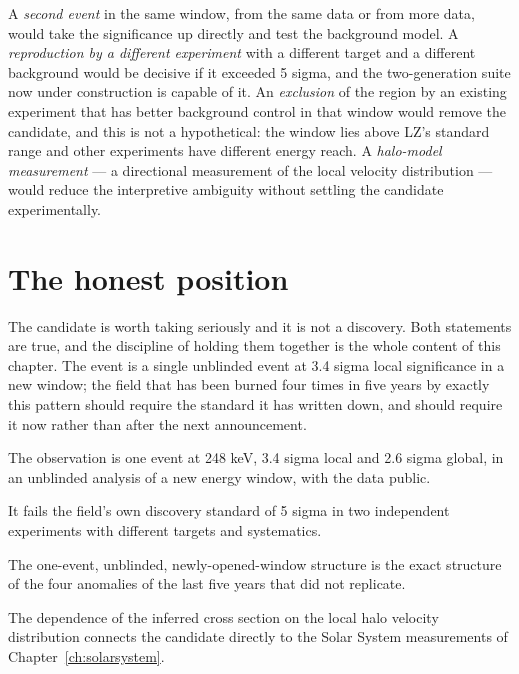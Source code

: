 A \emph{second event} in the same window, from the same data or from more
data, would take the significance up directly and test the background
model. A \emph{reproduction by a different experiment} with a different
target and a different background would be decisive if it exceeded 5 sigma,
and the two-generation suite now under construction is capable of it.
An \emph{exclusion} of the region by an existing experiment that has better
background control in that window would remove the candidate, and this is
not a hypothetical: the window lies above LZ's standard range and other
experiments have different energy reach. A \emph{halo-model measurement} ---
a directional measurement of the local velocity distribution --- would
reduce the interpretive ambiguity without settling the candidate
experimentally.

\section{The honest position}The candidate is worth taking seriously and it is not
a discovery. Both statements are true, and the discipline of holding them
together is the whole content of this chapter. The event is a single
unblinded event at 3.4 sigma local significance in a new window; the field
that has been burned four times in five years by exactly this pattern should
require the standard it has written down, and should require it now rather
than after the next announcement.

\begin{keytakeaways}
\item The observation is one event at 248 keV, 3.4 sigma local and 2.6 sigma
global, in an unblinded analysis of a new energy window, with the data
public.
\item It fails the field's own discovery standard of 5 sigma in two
independent experiments with different targets and systematics.
\item The one-event, unblinded, newly-opened-window structure is the exact
structure of the four anomalies of the last five years that did not
replicate.
\item The dependence of the inferred cross section on the local halo velocity
distribution connects the candidate directly to the Solar System
measurements of Chapter~\ref{ch:solarsystem}.
\end{keytakeaways}
